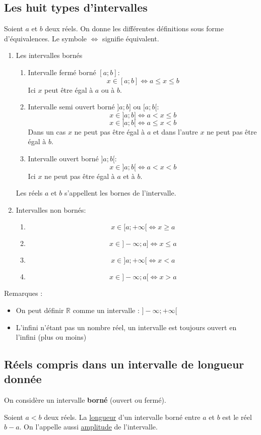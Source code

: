 \documentclass[10pt,a4paper,oneside]{book}
\newcommand{\R}{\mathbb{R}}
\begin{document}
  \subsection*{Les huit types d'intervalles}
  Soient $a$ et $b$ deux réels. On donne les différentes définitions sous forme 
  d'équivalences. Le symbole $\Longleftrightarrow$ signifie équivalent. 
  \begin{enumerate}
    \item Les intervalles bornés
    \begin{enumerate}
      \item Intervalle fermé borné $[a;b]$: 
      $$x\in[a;b]\Longleftrightarrow a\leq x\leq b$$
      Ici $x$ peut être égal à $a$ ou à $b$.
      \item Intervalle semi ouvert borné $]a;b]$ ou $[a;b[$: 
      $$x\in]a;b]\Longleftrightarrow a<x\leq b$$
      $$x\in[a;b[\Longleftrightarrow a\leq x< b$$
      Dans un cas $x$ ne peut pas être égal à $a$ et dans l'autre $x$ ne peut 
      pas être égal à $b$. 
       \item Intervalle ouvert borné $]a;b[$: 
      $$x\in]a;b[\Longleftrightarrow a< x< b$$
      Ici $x$ ne peut pas être égal à $a$ et à $b$.
    \end{enumerate}
    \begin{de}
      Les réels $a$ et $b$ s'appellent les bornes de l'intervalle.
    \end{de}
    \item Intervalles non bornés:
    \begin{enumerate}
      \item $$x\in[a;+\infty[\Longleftrightarrow x\geq a$$
      \item $$x\in]-\infty;a]\Longleftrightarrow x\leq a$$
      \item $$x\in]a;+\infty[\Longleftrightarrow x<a$$
      \item $$x\in]-\infty;a[\Longleftrightarrow x> a$$
    \end{enumerate}
  \end{enumerate}
   Remarques : \begin{itemize}
      \item On peut définir $\R$ comme un intervalle :  $]-\infty;+\infty[$
      \item L'infini n'étant pas un nombre réel, un intervalle est toujours ouvert en l'infini (plus ou moins)
  \end{itemize}
  
  
  \subsection*{Réels compris dans un intervalle de longueur donnée}
  On considère un intervalle \textbf{borné} (ouvert ou fermé). 
  \begin{de}
    Soient $a<b$ deux réels. La \underline{longueur} d'un intervalle borné entre $a$ et $b$ 
    est le réel $b-a$. On l'appelle aussi \underline{amplitude} de l'intervalle.
  \end{de}
\end{document}
